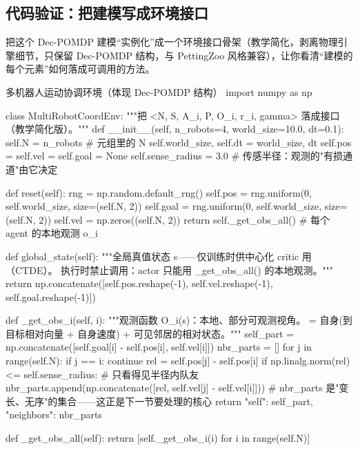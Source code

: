 \subsection{代码验证：把建模写成环境接口}
\label{sec:mc-decpomdp-code}

把这个 Dec-POMDP 建模“实例化”成一个环境接口骨架（教学简化，剥离物理引擎细节，只保留 Dec-POMDP 结构，与 PettingZoo 风格兼容），让你看清“建模的每个元素”如何落成可调用的方法。

\begin{codebox}[Python]{多机器人运动协调环境（体现 Dec-POMDP 结构）}
import numpy as np

class MultiRobotCoordEnv:
    """把 <N, S, {A_i}, P, {O_i}, {r_i}, gamma> 落成接口（教学简化版）。"""
    def __init__(self, n_robots=4, world_size=10.0, dt=0.1):
        self.N = n_robots                  # 元组里的 N
        self.world_size, self.dt = world_size, dt
        self.pos = self.vel = self.goal = None
        self.sense_radius = 3.0            # 传感半径：观测的"有损通道"由它决定

    def reset(self):
        rng = np.random.default_rng()
        self.pos  = rng.uniform(0, self.world_size, size=(self.N, 2))
        self.goal = rng.uniform(0, self.world_size, size=(self.N, 2))
        self.vel  = np.zeros((self.N, 2))
        return self._get_obs_all()         # 每个 agent 的本地观测 o_i

    def global_state(self):
        """全局真值状态 s——仅训练时供中心化 critic 用（CTDE）。
        执行时禁止调用：actor 只能用 _get_obs_all() 的本地观测。"""
        return np.concatenate([self.pos.reshape(-1),
                               self.vel.reshape(-1), self.goal.reshape(-1)])

    def _get_obs_i(self, i):
        """观测函数 O_i(s)：本地、部分可观测视角。
        = 自身(到目标相对向量 + 自身速度) + 可见邻居的相对状态。"""
        self_part = np.concatenate([self.goal[i] - self.pos[i], self.vel[i]])
        nbr_parts = []
        for j in range(self.N):
            if j == i:
                continue
            rel = self.pos[j] - self.pos[i]
            if np.linalg.norm(rel) <= self.sense_radius:   # 只看得见半径内队友
                nbr_parts.append(np.concatenate([rel, self.vel[j] - self.vel[i]]))
        # nbr_parts 是"变长、无序"的集合——这正是下一节要处理的核心
        return {"self": self_part, "neighbors": nbr_parts}

    def _get_obs_all(self):
        return [self._get_obs_i(i) for i in range(self.N)]


\end{codebox}
